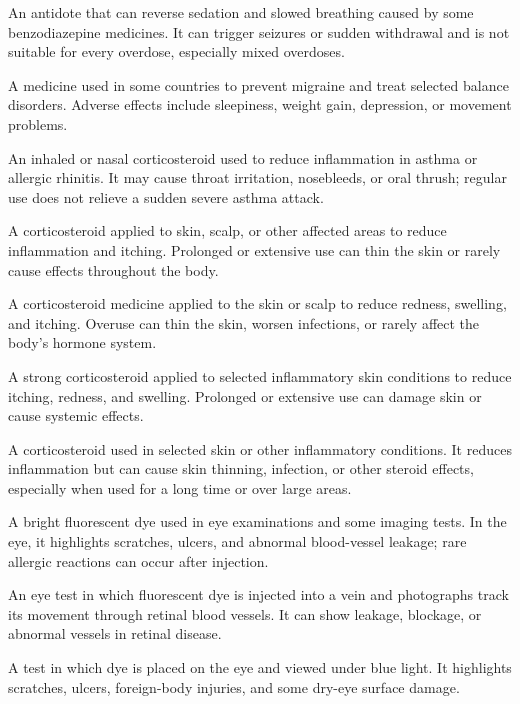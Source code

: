  An antidote that can reverse sedation and slowed breathing caused by some benzodiazepine medicines. It can trigger seizures or sudden withdrawal and is not suitable for every overdose, especially mixed overdoses.

 A medicine used in some countries to prevent migraine and treat selected balance disorders. Adverse effects include sleepiness, weight gain, depression, or movement problems.

 An inhaled or nasal corticosteroid used to reduce inflammation in asthma or allergic rhinitis. It may cause throat irritation, nosebleeds, or oral thrush; regular use does not relieve a sudden severe asthma attack.

 A corticosteroid applied to skin, scalp, or other affected areas to reduce inflammation and itching. Prolonged or extensive use can thin the skin or rarely cause effects throughout the body.

 A corticosteroid medicine applied to the skin or scalp to reduce redness, swelling, and itching. Overuse can thin the skin, worsen infections, or rarely affect the body’s hormone system.

 A strong corticosteroid applied to selected inflammatory skin conditions to reduce itching, redness, and swelling. Prolonged or extensive use can damage skin or cause systemic effects.

 A corticosteroid used in selected skin or other inflammatory conditions. It reduces inflammation but can cause skin thinning, infection, or other steroid effects, especially when used for a long time or over large areas.

 A bright fluorescent dye used in eye examinations and some imaging tests. In the eye, it highlights scratches, ulcers, and abnormal blood-vessel leakage; rare allergic reactions can occur after injection.

 An eye test in which fluorescent dye is injected into a vein and photographs track its movement through retinal blood vessels. It can show leakage, blockage, or abnormal vessels in retinal disease.

 A test in which dye is placed on the eye and viewed under blue light. It highlights scratches, ulcers, foreign-body injuries, and some dry-eye surface damage.


